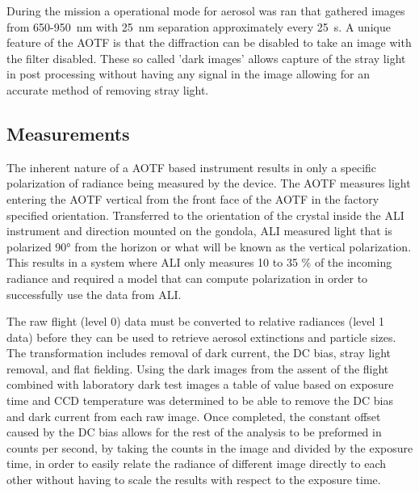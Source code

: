 \documentclass[12pt, draft]{article}
\begin{document}
During the mission a operational mode for aerosol was ran that gathered images from 650-950~nm with 25~nm separation approximately every 25~s. A unique feature of the AOTF is that the diffraction can be disabled to take an image with the filter disabled. These so called 'dark images' allows capture of the stray light in post processing without having any signal in the image allowing for an accurate method of removing stray light.

\subsection{Measurements}

The inherent nature of a AOTF based instrument results in only a specific polarization of radiance being measured by the device. The AOTF measures light entering the AOTF vertical from the front face of the AOTF in the factory specified orientation. Transferred to the orientation of the crystal inside the ALI instrument and direction mounted on the gondola, ALI measured light that is polarized 90\si{\degree} from the horizon or what will be known as the vertical polarization. This results in a system where ALI only measures 10 to 35 \% of the incoming radiance and required a model that can compute polarization in order to successfully use the data from ALI.

The raw flight (level 0) data must be converted to relative radiances (level 1 data) before they can be used to retrieve aerosol extinctions and particle sizes. The transformation includes removal of dark current, the DC bias, stray light removal, and flat fielding. Using the dark images from the assent of the flight combined with laboratory dark test images a table of value based on exposure time and CCD temperature was determined to be able to remove the DC bias and dark current from each raw image. Once completed, the constant offset caused by the DC bias allows for the rest of the analysis to be preformed in counts per second, by taking the counts in the image and divided by the exposure time, in order to easily relate the radiance of different image directly to each other without having to scale the results with respect to the exposure time.
\end{document}
